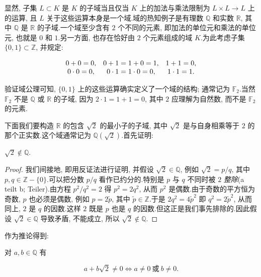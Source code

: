 显然, 子集 $L \subset K$ 是 $K$ 的子域当且仅当 $K$ 上的加法与乘法限制为 $L \times L \longrightarrow L$ 上的运算, 且 $L$ 关于这些运算本身是一个域.域的热知例子是有理数 $\mathbb{Q}$ 和实数 $\mathbb{R}$, 其中 $\mathbb{Q}$ 是 $\mathbb{R}$ 的子域.一个域至少含有 $2$ 个不同的元素, 即加法的单位元和乘法的单位元, 也就是 $0$ 和 $1$.另一方面, 也存在恰好由 $2$ 个元素组成的域 $K$.为此考虑子集 $\{0, 1\} \subset \mathbb{Z}$, 并规定:

\[
\begin{array}{c c c}
0 + 0 = 0, & 0 + 1 = 1 + 0 = 1, & 1 + 1 = 0, \\
0 \cdot 0 = 0, & 0 \cdot 1 = 1 \cdot 0 = 0, & 1 \cdot 1 = 1.
\end{array}
\]

验证域公理可知, $\{0, 1\}$ 上的这些运算确实定义了一个域的结构; 通常记为 $\mathbb{F}_2$.当然 $\mathbb{F}_2$ 不是 $\mathbb{Q}$ 或 $\mathbb{R}$ 的子域, 因为 $2 \cdot 1 = 1 + 1 = 0$, 其中 $2$ 应理解为自然数, 而不是 $\mathbb{F}_2$ 的元素.

下面我们要构造 $\mathbb{R}$ 的包含 $\sqrt{2}$ 的最小子的子域, 其中 $\sqrt{2}$ 是与自身相乘等于 $2$ 的那个正实数.这个域通常记为 $\mathbb{Q}(\sqrt{2})$.首先证明:

\begin{lemma}\label{lem:1.3.4}
$\sqrt{2} \notin \mathbb{Q}$.
\end{lemma}

\begin{proof}
我们间接地, 即用反证法进行证明, 并假设 $\sqrt{2} \in \mathbb{Q}$, 例如 $\sqrt{2} = p/q$, 其中 $p, q \in \mathbb{Z} - \{0\}$.可以把分数 $p/q$ 看作已约分的.特别是 $p$ 与 $q$ 不同时被 $2$ \emph{整除}(\textup{a teilt b; Teiler}).由方程 $p^2/q^2 = 2$ 得 $p^2 = 2q^2$, 从而 $p^2$ 是偶数.由于奇数的平方恒为奇数, $p$ 也必须是偶数, 例如 $p = 2\tilde{p}$, 其中 $\tilde{p} \in \mathbb{Z}$.于是 $2q^2 = 4\tilde{p}^2$ 即 $q^2 = 2\tilde{p}^2$, 从而同上, $2$ 是 $q$ 的因数.这样 $2$ 既是 $p$ 也是 $q$ 的因数.但这正是我们事先排除的.因此假设 $\sqrt{2} \in \mathbb{Q}$ 导致矛盾, 不能成立, 所以 $\sqrt{2} \notin \mathbb{Q}$.
\end{proof}

作为推论得到:

\begin{lemma}\label{lem:1.3.5}
对 $a, b \in \mathbb{Q}$ 有

\[
a + b\sqrt{2} \neq 0 \Longleftrightarrow a \neq 0 \ \text{或}\ b \neq 0.
\]
\end{lemma}

